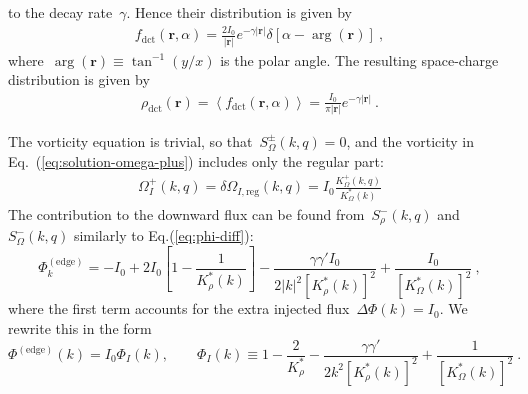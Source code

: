 \documentclass[preprint,aps,eqsecnum, prb]{revtex4-1}
\newcommand{\fplus}[1]{{#1}^{+}}
\newcommand{\fminus}[1]{{#1}^{-}}
\newcommand{\fplusminus}[1]{{#1}^{\pm}}
\newcommand{\dct}[1]{{#1}_\mathrm{dct}}
\begin{document}
to the decay rate~$\gamma$. Hence their distribution is given by
\begin{align}
  \label{eq:f-direct}
  \dct{f}({\bm r}, \alpha) = \frac{2I_0}{|{\bm r}|} e^{-\gamma|{\bm r}|}
  \delta \left[\alpha - \arg({\bm r})\right]\ ,
\end{align}
where~$\arg({\bm r}) \equiv \tan^{-1}(y/x)$ is the polar angle.
The resulting space-charge distribution
is given by
\begin{align}
  \label{eq:rho-direct-edge}
  \dct{\rho}({\bm r}) = \left\langle \dct{f}({\bm r}, \alpha) \right\rangle
  = \frac{I_0}{\pi|{\bm r}|} e^{-\gamma |{\bm r}|}\ .
\end{align}

The vorticity equation is trivial, so that~$\fplusminus{S}_\Omega(k, q) = 0$,
and the vorticity in Eq.~(\ref{eq:solution-omega-plus}) includes
only the regular part:
\begin{align}
  \label{eq:iso-omega}
  \fplus{\Omega}_{I}(k, q)
  = \delta\Omega_{I, \mathrm{reg}}(k, q)
  = I_0 \frac{\fplus{K}_\Omega(k, q)}{K_\Omega^\ast(k)}
\end{align}
The contribution to the downward flux can be found from~$\fminus{S}_\rho(k, q)$
and~$\fminus{S}_\Omega(k, q)$ similarly to Eq.(\ref{eq:phi-diff}):
\begin{equation}
  \label{eq:iso-flux-dPhi}
  \Phi^\mathrm{(edge)}_{k} =  -I_0
  + 2 I_0 \left[1 - \frac{1}{K_\rho^\ast(k)}\right]
  - \frac{\gamma \gamma' I_0}{2|k|^2 \left[K_\rho^\ast(k)\right]^2}
  + \frac{I_0}{\left[K_\Omega^\ast(k)\right]^2}
\ ,
\end{equation}
where the first term accounts for
the extra injected flux~$\Delta\Phi(k) = I_0$.
We rewrite this in the form
\begin{equation}
  \label{eq:phi-iso-surf}
  \Phi^\mathrm{(edge)}(k) =
  I_0 \Phi_I(k), \qquad
  \Phi_I(k) \equiv 1  - \frac{2}{K_\rho^\ast}
    - \frac{\gamma \gamma'}{2k^2 \left[K_\rho^\ast(k)\right]^2}
    + \frac{1}{\left[K_\Omega^\ast(k)\right]^2} \ .
\end{equation}
%
\end{document}
